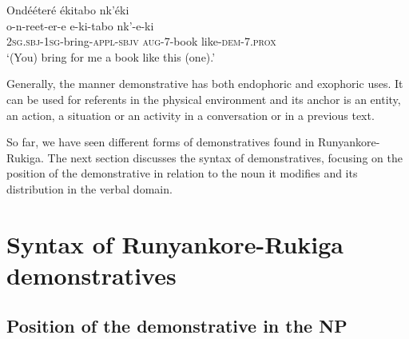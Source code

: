 \documentclass[output=paper 		  ]{langscibook}
\begin{document}
\ea%
    \label{ex:asiimwe:28}
    \label{ex:asiimwe:28a}

  \label{ex:asiimwe:28b}
    \z
\z

\newpage
\ea%
    \label{ex:asiimwe:29}
    Ondééteré ékitabo nk’éki\\
 \gll o-n-reet-er-e    e-ki-tabo  nk’-e-ki\\
  \textsc{2sg.sbj-1sg}{}-bring-\textsc{appl-sbjv}  \textsc{aug}{}-7-book  like-\textsc{dem}{}-7.\textsc{prox}\\
    \glt ‘(You) bring for me a book like this (one).’
\z

Generally, the manner demonstrative has both endophoric and exophoric uses. It can be used for referents in the physical environment and its anchor is an entity, an action, a situation or an activity in a conversation or in a previous text.

So far, we have seen different forms of demonstratives found in Run\-yan\-ko\-re-Ru\-ki\-ga. The next section discusses the syntax of demonstratives, focusing on the position of the demonstrative in relation to the noun it modifies and its distribution in the verbal domain.

\section{Syntax of Run\-yan\-ko\-re-Ru\-ki\-ga demonstratives}
\label{sec:asiimwe:3}

\subsection{Position of the demonstrative in the NP}\label{sec:asiimwe:3.1}
\end{document}
